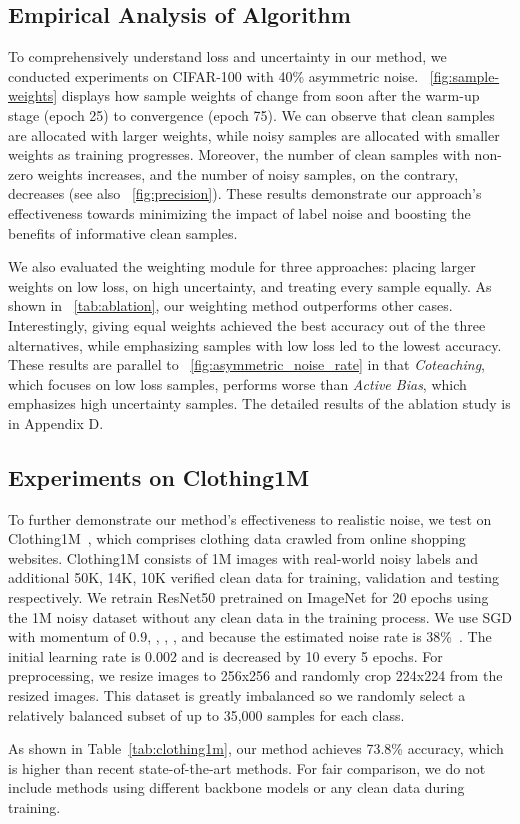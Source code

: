 \subsection{ Empirical Analysis of Algorithm }
To comprehensively understand loss and uncertainty in our method, we conducted experiments on CIFAR-100 with 40\% asymmetric noise. \figurename~\ref{fig:sample-weights} displays how sample weights of \prgname{} change from soon after the warm-up stage (epoch 25) to convergence (epoch 75). 
We can observe that clean samples are allocated with larger weights, while noisy samples are allocated with smaller weights as training progresses. Moreover, the number of clean samples with non-zero weights increases, and the number of noisy samples, on the contrary, decreases (see also \figurename~\ref{fig:precision}). These results demonstrate our approach's effectiveness towards minimizing the impact of label noise and boosting the benefits of informative clean samples.

We also evaluated the weighting module for three approaches: placing larger weights on low loss, on high uncertainty, and treating every sample equally. As shown in \tablename~\ref{tab:ablation}, our weighting method outperforms other cases. Interestingly, giving equal weights achieved the best accuracy out of the three alternatives, while emphasizing samples with low loss led to the lowest accuracy. These results are parallel to \figurename~\ref{fig:asymmetric_noise_rate} in that \textit{Coteaching}, which focuses on low loss samples, performs worse than \textit{Active Bias}, which emphasizes high uncertainty samples. The detailed results of the ablation study is in Appendix D.

\subsection{Experiments on Clothing1M}
To further demonstrate our method’s effectiveness to realistic noise, we test on Clothing1M~\cite{xiao2015learning}, which comprises clothing data crawled from online shopping websites. Clothing1M consists of 1M images with real-world noisy labels and additional 50K, 14K, 10K verified clean data for training, validation and testing respectively. We retrain ResNet50 pretrained on ImageNet for 20 epochs using the 1M noisy dataset without any clean data in the training process. We use SGD with momentum of 0.9, , , , and  because the estimated noise rate is 38\%~\cite{huang2019o2u, yi2019probabilistic}. The initial learning rate is 0.002 and is decreased by 10 every 5 epochs. For preprocessing, we resize images to 256x256 and randomly crop 224x224 from the resized images. This dataset is greatly imbalanced so we randomly select a relatively balanced subset of up to 35,000 samples for each class. 

As shown in Table~\ref{tab:clothing1m}, our method achieves 73.8\% accuracy, which is higher than recent state-of-the-art methods. For fair comparison, we do not include methods using different backbone models or any clean data during training.

